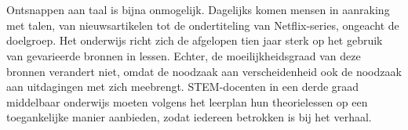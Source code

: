 
\chapter{}%
\label{ch:inleiding}



Ontsnappen aan taal is bijna onmogelijk. Dagelijks komen mensen in aanraking met talen, van nieuwsartikelen tot de ondertiteling van Netflix-series, ongeacht de doelgroep. Het onderwijs richt zich de afgelopen tien jaar sterk op het gebruik van gevarieerde bronnen in lessen. Echter, de moeilijkheidsgraad van deze bronnen verandert niet, omdat de noodzaak aan verscheidenheid ook de noodzaak aan uitdagingen met zich meebrengt. STEM-docenten in een derde graad middelbaar onderwijs moeten volgens het leerplan hun theorielessen op een toegankelijke manier aanbieden, zodat iedereen betrokken is bij het verhaal.

\section{}%
\label{sec:probleemstelling}


